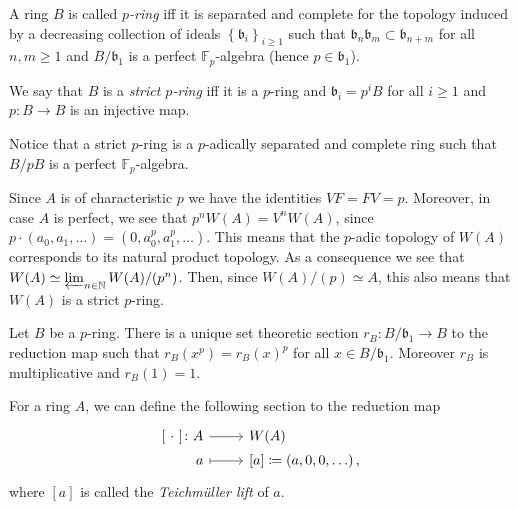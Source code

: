 \begin{defn}
	A ring $B$ is called \emph{$p$-ring} iff it is separated and complete
	for the topology induced by a decreasing collection of ideals
	$\left\{ \mathfrak{b}_i \right\}_{i \geq 1}$ such that 
	$\mathfrak{b}_n \mathfrak{b}_m \subset \mathfrak{b}_{n+m}$
	for all $n,m \geq 1$
	and $B/\mathfrak{b}_1$ is a perfect $\mathbb{F}_p$-algebra
	(hence $p \in \mathfrak{b}_1$).

	We say that $B$ is a \emph{strict $p$-ring} iff it is a $p$-ring
	and $\mathfrak{b}_i = p^iB$ for all $i \geq 1$
	and $p\colon B \to B$ is an injective map.
\end{defn}


\begin{rem}[]
	Notice that a strict $p$-ring is a $p$-adically separated and complete
	ring such that $B/pB$ is a perfect $\mathbb{F}_p$-algebra.
\end{rem}


\begin{rem}[]
	Since $A$ is of characteristic $p$ we have the identities
	$VF = FV = p$.
	Moreover, in case $A$ is perfect, we see that $p^nW(A) = V^nW(A)$,
	since $p \cdot \left( a_0, a_1, \ldots \right) =
	(0, a_0^p, a_1^p, \ldots)$.
	This means that the $p$-adic topology of $W(A)$ corresponds
	to its natural product topology.
	As a consequence we see that
	$W(A) \simeq \varprojlim_{n \in \mathbb{N}} W(A)/ (p^n)$.
	Then, since $W(A)/ (p) \simeq A$, this also means that $W(A)$ is a strict $p$-ring.
\end{rem}


\begin{lem}\label{pRingSection}
	Let $B$ be a $p$-ring.
	There is a unique set theoretic section
	$r_B\colon B/\mathfrak{b}_1 \to B$
	to the reduction map such that
	$r_B(x^p) = r_B(x)^p$
	for all $x \in B/\mathfrak{b}_1$.
	Moreover $r_B$ is multiplicative and $r_B(1) = 1$.
\end{lem} 


\begin{defn}
	For a ring $A$, we can define the following section to the reduction map
	\begin{equation*}
	\begin{tikzcd}[row sep = 0ex
		,/tikz/column 1/.append style={anchor=base east}
		,/tikz/column 2/.append style={anchor=base west}]
		[\ \cdot \ ]\colon A \arrow[r, "", rightarrow] &
		W(A) \\
		a \arrow[r, "", mapsto] &
		[a] [a] \coloneqq \left( a, 0, 0, \ldots \right)
	,\end{tikzcd}
	\end{equation*} 
	where $[a]$ is called the \emph{Teichmüller lift} of $a$.
\end{defn}


